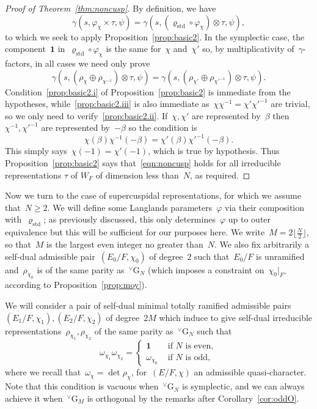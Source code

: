 \documentclass[12pt]{amsart}
\newcommand{\G}{\mathrm{G}}
\def\boI{\boldsymbol 1}
\def\rhostd{\varrho_{\mathrm{std}}} %
\def\vG{{}^\vee\G}
\begin{document}
\begin{proof}[Proof of Theorem~\ref{thm:noncusp}]
By definition, we have
\[
\gamma(s, \varphi_\chi \times \tau, \psi) = \gamma(s, (\rhostd\circ \varphi_{\chi}) \otimes \tau, \psi),
\]
to which we seek to apply Proposition~\ref{prop:basic2}. In the symplectic case, the component~$\boI$ in~$\rhostd\circ \varphi_{\chi}$ is the same for~$\chi$ and~$\chi'$ so, by multiplicativity of~$\gamma$-factors, in all cases we need only prove
\begin{equation}\label{eqn:noncusp}
\gamma(s, (\rho_\chi\oplus\rho_{\chi^{-1}}) \otimes \tau, \psi) = \gamma(s, (\rho_{\chi'}\oplus\rho_{\chi'^{-1}}) \otimes \tau, \psi).
\end{equation}
Condition~\ref{prop:basic2.i} of Proposition~\ref{prop:basic2} is immediate from the hypotheses, while~\ref{prop:basic2.iii} is also immediate as~$\chi\chi^{-1}=\chi'\chi'^{-1}$ are trivial, so we only need to verify~\ref{prop:basic2.ii}. If~$\chi,\chi'$ are represented by~$\beta$ then~$\chi^{-1},\chi'^{-1}$ are represented by~$-\beta$ so the condition is
\[
\chi(\beta)\chi^{-1}(-\beta)=\chi'(\beta)\chi'^{-1}(-\beta).
\]
This simply says~$\chi(-1)=\chi'(-1)$, which is true by hypothesis. Thus Proposition~\ref{prop:basic2} says that~\eqref{eqn:noncusp} holds for all irreducible representations $\tau$ of $W_F$ of dimension less than~$N$, as required.
\end{proof}

Now we turn to the case of supercuspidal representations, for which we assume that~$N\ge 2$. We will define some Langlands parameters~$\varphi$ via their composition with~$\rhostd$; as previously discussed, this only determines~$\varphi$ up to outer equivalence but this will be sufficient for our purposes here. We write~$M=2\lfloor\frac N2\rfloor$, so that~$M$ is the largest even integer no greater than~$N$. We also fix arbitrarily a self-dual admissible pair~$(E_0/F,\chi_0)$ of degree~$2$ such that~$E_0/F$ is unramified and~$\rho_{\chi_0}$ is of the same parity as~$\vG_N$ (which imposes a constraint on~$\chi_0|_{F^\times}$ according to Proposition~\ref{prop:moy}).

We will consider a pair of self-dual minimal totally ramified admissible pairs $(E_1/F,\chi_1),(E_2/F,\chi_2)$ of degree~$2M$ which induce to give self-dual irreducible representations~$\rho_{\chi_1},\rho_{\chi_2}$ of the same parity as~$\vG_N$ such that
\[
\omega_{\chi_1}\omega_{\chi_2} = \begin{cases} 
\boI &\text{ if~$N$ is even},\\
\omega_{\chi_0} &\text{ if~$N$ is odd},
\end{cases}
\]
where we recall that~$\omega_\chi=\det\rho_\chi$, for~$(E/F,\chi)$ an admissible quasi-character. Note that this condition is vacuous when~$\vG_N$ is symplectic, and we can always achieve it when~$\vG_M$ is orthogonal by the remarks after Corollary~\ref{cor:oddO}. 
\end{document}
